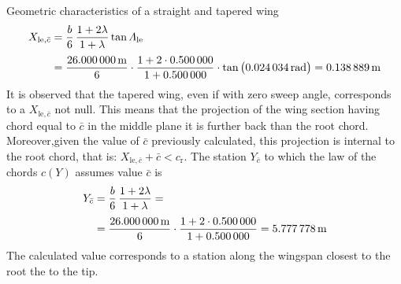 \documentclass[[12pt,twoside]{book}
\begin{document}
\begin{myExampleX}{Geometric characteristics of a straight and tapered wing}{}
\[
\begin{split}
X_{\mathrm{le},\bar{c}} 
  & {}=
    \frac{b}{6} \, \frac{1+2\lambda}{1+\lambda} \tan\Lambda_\mathrm{le} \\[3pt]
  & {}=
    \frac{\SI[round-precision=1]{\mySpanWingMT}{\metre}}{6}
      \cdot 
      \frac{
        1 + 2\cdot\SI[round-precision=2]{\myTaperRatioWing}{}
      }{
        1 + \SI[round-precision=2]{\myTaperRatioWing}{}
      }
      \cdot \tan \big( \SI[round-precision=3]{\myLambdaLERad}{\radian} \big)
    =  \SI[round-precision=2]{\myXLEMACWingMT}{\metre} %
\end{split}
\]
It is observed that the tapered wing, even if with zero sweep angle, corresponds to a $X_{\mathrm{le},\bar{c}}$ not null. This means that the projection of the wing section having chord equal to $\bar{c}$ in the middle plane it is further back than the root chord. Moreover,given the value of $\bar{c}$ previously calculated, this projection is internal to the root chord, that is:
$X_{\mathrm{le},\bar{c}}+\bar{c}<c_\mathrm{r}$.
The  station $Y_{\bar{c}}$ to which the law of the chords $c(Y)$ assumes value $\bar{c}$ is
\[
\begin{split}
Y_{\bar{c}} 
  & {}=
    \frac{b}{6} \, \frac{1+2\lambda}{1+\lambda} = \\[3pt]
  & {}=
    \frac{\SI[round-precision=1]{\mySpanWingMT}{\metre}}{6}
      \cdot 
      \frac{
        1 + 2\cdot\SI[round-precision=2]{\myTaperRatioWing}{}
      }{
        1 + \SI[round-precision=2]{\myTaperRatioWing}{}
      }
    =  \SI[round-precision=2]{\myYMACWingMT}{\metre} 
\end{split}
\]
The calculated value corresponds to a station along the wingspan closest to the root the to the tip.
\end{myExampleX}
\end{document}

